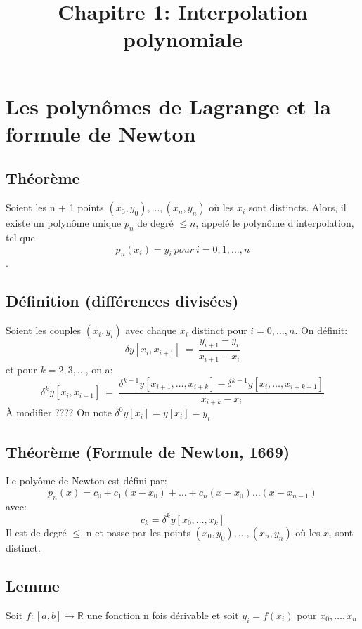 \documentclass{article}
\title{Chapitre 1: Interpolation polynomiale}
\begin{document}
\maketitle

\section{Les polynômes de Lagrange et la formule de Newton}
\subsection{Théorème}
Soient les n + 1 points $(x_0, y_0), . . . , (x_n , y_n )$ où les $x_i$ sont distincts. Alors, il
existe un polynôme unique $p_n$ de degré $\leq n$, appelé le polynôme d’interpolation, tel que
$$p_n (x_i ) = y_i\ pour\ i = 0, 1, . . . , n$$.

\subsection{Définition (différences divisées)}
Soient les couples $(x_i, y_i)$ avec chaque $x_i$ distinct pour $i = 0, \dots, n$. On définit:
$$\delta y[x_i, x_{i+1}]\ = \ \frac{y_{i + 1} - y_i}{x_{i+1} - x_i}$$
et pour $k = 2, 3, \dots$, on a:
$$\delta^k y[x_i, x_{i + 1}]\ = \ \frac{\delta^{k - 1} y[x_{i + 1}, \dots, x_{i + k}]- \delta^{k-1} y[x_i, \dots, x_{i + k - 1}]}{x_{i + k} - x_i}$$
À modifier ????
On note $\delta^0 y[x_i] = y[x_i] = y_i$
\subsection{Théorème (Formule de Newton, 1669)}
Le polyôme de Newton est défini par:
$$p_n(x) = c_0 + c_1(x-x_0) + \dots + c_n(x - x_0)\dots (x-x_{n - 1})$$
avec:
$$c_k = \delta^k y[x_0, \dots, x_k]$$
Il est de degré $\leq$ n et passe par les points $(x_0, y_0), \dots, (x_n, y_n)$ où les $x_i$ sont distinct.

\subsection{Lemme}
Soit $f: [a, b] \rightarrow \mathbb{R}$ une fonction n fois dérivable et soit $y_i = f(x_i)$ pour $x_0, \dots, x_n$
\end{document}
